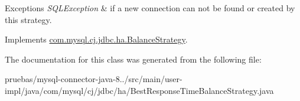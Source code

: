 \begin{DoxyExceptions}{Exceptions}
{\em S\+Q\+L\+Exception} & if a new connection can not be found or created by this strategy. \\
\hline
\end{DoxyExceptions}


Implements \mbox{\hyperlink{interfacecom_1_1mysql_1_1cj_1_1jdbc_1_1ha_1_1_balance_strategy_a754b8e7a4e4baad812f650b3222cfbd5}{com.\+mysql.\+cj.\+jdbc.\+ha.\+Balance\+Strategy}}.



The documentation for this class was generated from the following file\+:\begin{DoxyCompactItemize}
\item 
pruebas/mysql-\/connector-\/java-\/8../src/main/user-\/impl/java/com/mysql/cj/jdbc/ha/Best\+Response\+Time\+Balance\+Strategy.\+java\end{DoxyCompactItemize}
